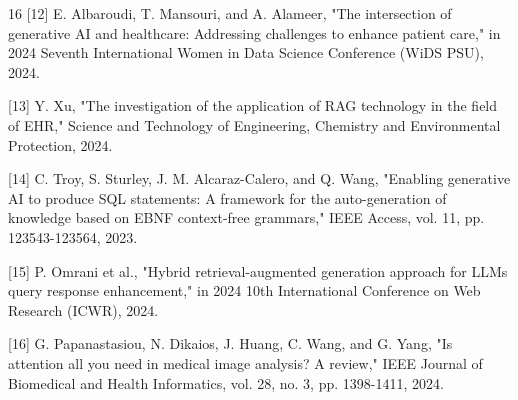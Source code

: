 \documentclass[conference]{IEEEtran}
\begin{document}
\begin{thebibliography}{16}
[12] E. Albaroudi, T. Mansouri, and A. Alameer, "The intersection of generative AI and healthcare: Addressing challenges to enhance patient care," in 2024 Seventh International Women in Data Science Conference (WiDS PSU), 2024.

[13] Y. Xu, "The investigation of the application of RAG technology in the field of EHR," Science and Technology of Engineering, Chemistry and Environmental Protection, 2024.

[14] C. Troy, S. Sturley, J. M. Alcaraz-Calero, and Q. Wang, "Enabling generative AI to produce SQL statements: A framework for the auto-generation of knowledge based on EBNF context-free grammars," IEEE Access, vol. 11, pp. 123543-123564, 2023.

[15] P. Omrani et al., "Hybrid retrieval-augmented generation approach for LLMs query response enhancement," in 2024 10th International Conference on Web Research (ICWR), 2024.

[16] G. Papanastasiou, N. Dikaios, J. Huang, C. Wang, and G. Yang, "Is attention all you need in medical image analysis? A review," IEEE Journal of Biomedical and Health Informatics, vol. 28, no. 3, pp. 1398-1411, 2024.
\end{thebibliography}
\end{document}
